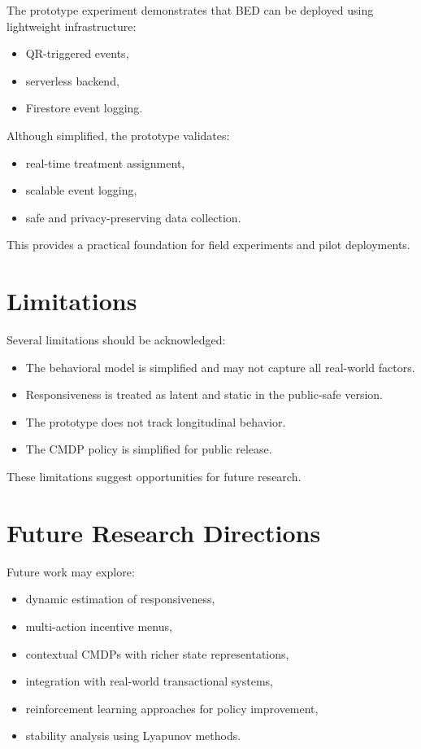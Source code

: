 The prototype experiment demonstrates that BED can be deployed using lightweight
infrastructure:

\begin{itemize}
    \item QR-triggered events,
    \item serverless backend,
    \item Firestore event logging.
\end{itemize}

Although simplified, the prototype validates:

\begin{itemize}
    \item real-time treatment assignment,
    \item scalable event logging,
    \item safe and privacy-preserving data collection.
\end{itemize}

This provides a practical foundation for field experiments and pilot deployments.

\section{Limitations}

Several limitations should be acknowledged:

\begin{itemize}
    \item The behavioral model is simplified and may not capture all real-world
    factors.
    \item Responsiveness is treated as latent and static in the public-safe
    version.
    \item The prototype does not track longitudinal behavior.
    \item The CMDP policy is simplified for public release.
\end{itemize}

These limitations suggest opportunities for future research.

\section{Future Research Directions}

Future work may explore:

\begin{itemize}
    \item dynamic estimation of responsiveness,
    \item multi-action incentive menus,
    \item contextual CMDPs with richer state representations,
    \item integration with real-world transactional systems,
    \item reinforcement learning approaches for policy improvement,
    \item stability analysis using Lyapunov methods.
\end{itemize}

